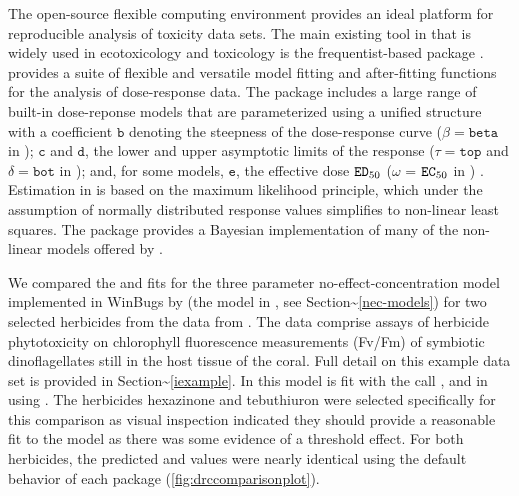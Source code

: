 \documentclass[
  shortnames]{jss}
\begin{document}
The open-source flexible computing environment  provides an ideal platform for reproducible analysis of toxicity data sets. The main existing tool in  that is widely used in ecotoxicology and toxicology is the frequentist-based package  \citep{Ritz2016}.  provides a suite of flexible and versatile model fitting and after-fitting functions for the analysis of dose-response data. The package includes a large range of built-in dose-reponse models that are parameterized using a unified structure with a coefficient \(\mathtt{b}\) denoting the steepness of the dose-response curve (\(\beta = \mathtt{beta}\) in ); \(\mathtt{c}\) and \(\mathtt{d}\), the lower and upper asymptotic limits of the response (\(\tau = \mathtt{top}\) and \(\delta = \mathtt{bot}\) in ); and, for some models, \(\mathtt{e}\), the effective dose \(\mathtt{ED\textsubscript{50}}\) (\(\omega\) = \(\mathtt{EC\textsubscript{50}}\) in ) \citep{Ritz2016}. Estimation in  is based on the maximum likelihood principle, which under the assumption of normally distributed response values simplifies to non-linear least squares. The  package provides a Bayesian implementation of many of the non-linear models offered by .

We compared the  and  fits for the three parameter no-effect-concentration model implemented in WinBugs by \citet{Fox2010} (the  model in , see Section\textasciitilde{}\ref{nec-models}) for two selected herbicides from the data from \citet{jones2003meps}. The data comprise assays of herbicide phytotoxicity on chlorophyll fluorescence measurements (Fv/Fm) of symbiotic dinoflagellates still in the host tissue of the coral. Full detail on this example data set is provided in Section\textasciitilde{}\ref{iexample}. In  this model is fit with the call , and in  using . The herbicides hexazinone and tebuthiuron were selected specifically for this comparison as visual inspection indicated they should provide a reasonable fit to the \citet{Fox2010} model as there was some evidence of a threshold effect. For both herbicides, the predicted  and  values were nearly identical using the default behavior of each package (\autoref{fig:drccomparisonplot}).
\end{document}
